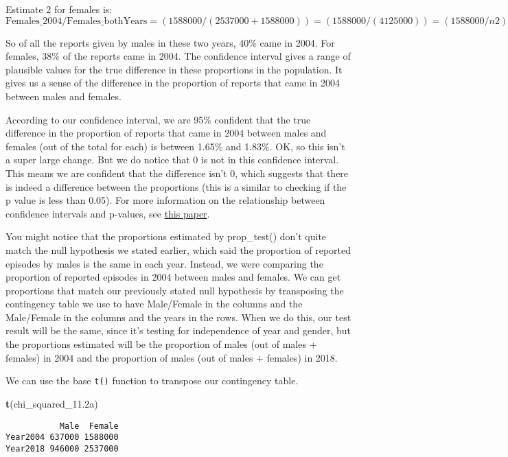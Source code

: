 \documentclass[
]{article}
\newenvironment{Shaded}{\begin{snugshade}}{\end{snugshade}}
\newcommand{\FloatTok}[1]{\textcolor[rgb]{0.00,0.00,0.81}{#1}}
\newcommand{\KeywordTok}[1]{\textcolor[rgb]{0.13,0.29,0.53}{\textbf{#1}}}
\newcommand{\NormalTok}[1]{#1}
\begin{document}
Estimate 2 for females is:
\[\text{Females_2004/Females_bothYears} =(1588000/(2537000 + 1588000)) = (1588000/(4125000)) = (1588000/n2) = .38\]

So of all the reports given by males in these two years, 40\% came in
2004. For females, 38\% of the reports came in 2004. The confidence
interval gives a range of plausible values for the true difference in
these proportions in the population. It gives us a sense of the
difference in the proportion of reports that came in 2004 between males
and females.

According to our confidence interval, we are 95\% confident that the
true difference in the proportion of reports that came in 2004 between
males and females (out of the total for each) is between 1.65\% and
1.83\%. OK, so this isn't a super large change. But we do notice that 0
is not in this confidence interval. This means we are confident that the
difference isn't 0, which suggests that there is indeed a difference
between the proportions (this is a similar to checking if the p value is
less than 0.05). For more information on the relationship between
confidence intervals and p-values, see
\href{https://www.ncbi.nlm.nih.gov/pmc/articles/PMC4111020/}{this
paper}.

You might notice that the proportions estimated by prop\_test() don't
quite match the null hypothesis we stated earlier, which said the
proportion of reported episodes by males is the same in each year.
Instead, we were comparing the proportion of reported episodes in 2004
between males and females. We can get proportions that match our
previously stated null hypothesis by transposing the contingency table
we use to have Male/Female in the columns and the Male/Female in the
columns and the years in the rows. When we do this, our test result will
be the same, since it's testing for independence of year and gender, but
the proportions estimated will be the proportion of males (out of males
+ females) in 2004 and the proportion of males (out of males + females)
in 2018.

We can use the base \texttt{t()} function to transpose our contingency
table.

\begin{Shaded}
\begin{Highlighting}[]
\KeywordTok{t}\NormalTok{(chi_squared_}\FloatTok{11.2}\NormalTok{a) }
\end{Highlighting}
\end{Shaded}

\begin{verbatim}
           Male  Female
Year2004 637000 1588000
Year2018 946000 2537000
\end{verbatim}
\end{document}
